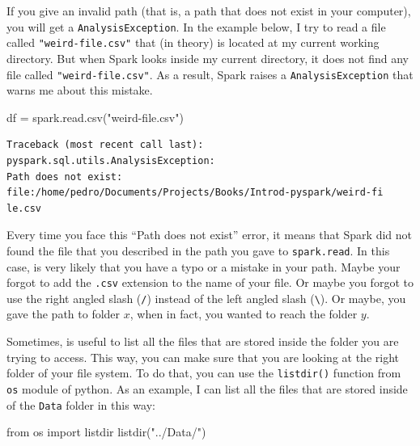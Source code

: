 \documentclass[
  11pt,
  letterpaper,
  DIV=11,
  numbers=noendperiod]{scrreprt}
\newenvironment{Shaded}{\begin{snugshade}}{\end{snugshade}}
\newcommand{\ImportTok}[1]{\textcolor[rgb]{0.00,0.46,0.62}{#1}}
\newcommand{\NormalTok}[1]{\textcolor[rgb]{0.00,0.23,0.31}{#1}}
\newcommand{\OperatorTok}[1]{\textcolor[rgb]{0.37,0.37,0.37}{#1}}
\newcommand{\StringTok}[1]{\textcolor[rgb]{0.13,0.47,0.30}{#1}}
\begin{document}
If you give an invalid path (that is, a path that does not exist in your
computer), you will get a \texttt{AnalysisException}. In the example
below, I try to read a file called \texttt{"weird-file.csv"} that (in
theory) is located at my current working directory. But when Spark looks
inside my current directory, it does not find any file called
\texttt{"weird-file.csv"}. As a result, Spark raises a
\texttt{AnalysisException} that warns me about this mistake.

\begin{Shaded}
\begin{Highlighting}[]
\NormalTok{df }\OperatorTok{=}\NormalTok{ spark.read.csv(}\StringTok{"weird{-}file.csv"}\NormalTok{)}
\end{Highlighting}
\end{Shaded}

\begin{verbatim}
Traceback (most recent call last):
pyspark.sql.utils.AnalysisException:
Path does not exist:
file:/home/pedro/Documents/Projects/Books/Introd-pyspark/weird-fi
le.csv
\end{verbatim}

Every time you face this ``Path does not exist'' error, it means that
Spark did not found the file that you described in the path you gave to
\texttt{spark.read}. In this case, is very likely that you have a typo
or a mistake in your path. Maybe your forgot to add the \texttt{.csv}
extension to the name of your file. Or maybe you forgot to use the right
angled slash (\texttt{/}) instead of the left angled slash
(\texttt{\textbackslash{}}). Or maybe, you gave the path to folder
\(x\), when in fact, you wanted to reach the folder \(y\).

Sometimes, is useful to list all the files that are stored inside the
folder you are trying to access. This way, you can make sure that you
are looking at the right folder of your file system. To do that, you can
use the \texttt{listdir()} function from \texttt{os} module of python.
As an example, I can list all the files that are stored inside of the
\texttt{Data} folder in this way:

\begin{Shaded}
\begin{Highlighting}[]
\ImportTok{from}\NormalTok{ os }\ImportTok{import}\NormalTok{ listdir}
\NormalTok{listdir(}\StringTok{"../Data/"}\NormalTok{)}
\end{Highlighting}
\end{Shaded}
\end{document}
